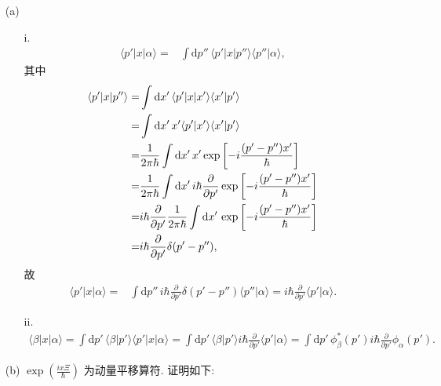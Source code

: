 \documentclass{assignment}
\begin{document}
\begin{pf}
    \begin{itemize}
        \item[(a)] 
        \begin{itemize}
            \item[i.] 
            \begin{align}
                \langle p'\rvert x\lvert\alpha\rangle=&\int\mathrm{d}p''\,\langle p'\rvert x\lvert p''\rangle\langle p''\vert\alpha\rangle,
            \end{align}
            其中
            \begin{align}
                \notag\langle p'\rvert x\lvert p''\rangle=&\int\mathrm{d}x'\,\langle p'\rvert x\lvert x'\rangle\langle x'\vert p'\rangle\\
                \notag=&\int\mathrm{d}x'\,x'\langle p'\vert x'\rangle\langle x'\vert p'\rangle\\
                \notag=&\frac{1}{2\pi\hbar}\int\mathrm{d}x'\,x'\exp\left[-i\frac{(p'-p'')x'}{\hbar}\right]\\
                \notag=&\frac{1}{2\pi\hbar}\int\mathrm{d}x'\,i\hbar\frac{\partial}{\partial p'}\exp\left[-i\frac{(p'-p'')x'}{\hbar}\right]\\
                \notag=&i\hbar\frac{\partial}{\partial p'}\frac{1}{2\pi\hbar}\int\mathrm{d}x'\,\exp\left[-i\frac{(p'-p'')x'}{\hbar}\right]\\
                =&i\hbar\frac{\partial}{\partial p'}\delta(p'-p''),
            \end{align}
            故
            \begin{align}
                \langle p'\rvert x\lvert\alpha\rangle=&\int\mathrm{d}p''\,i\hbar\frac{\partial}{\partial p'}\delta(p'-p'')\langle p''\vert\alpha\rangle=i\hbar\frac{\partial}{\partial p'}\langle p'\vert\alpha\rangle.
            \end{align}
            \item[ii.] 
            \begin{align}
                \langle\beta\rvert x\lvert\alpha\rangle=\int\mathrm{d}p'\,\langle\beta\vert p'\rangle\langle p'\rvert x\lvert\alpha\rangle=\int\mathrm{d}p'\,\langle\beta\vert p'\rangle i\hbar\frac{\partial}{\partial p'}\langle p'\vert\alpha\rangle=\int\mathrm{d}p'\,\phi_{\beta}^*(p')i\hbar\frac{\partial}{\partial p'}\phi_{\alpha}(p').
            \end{align}
        \end{itemize}
        \item[(b)] $\exp\left(\frac{ix\Xi}{\hbar}\right)$ 为动量平移算符. 证明如下:\\

\end{itemize}
\end{pf}
\end{document}
